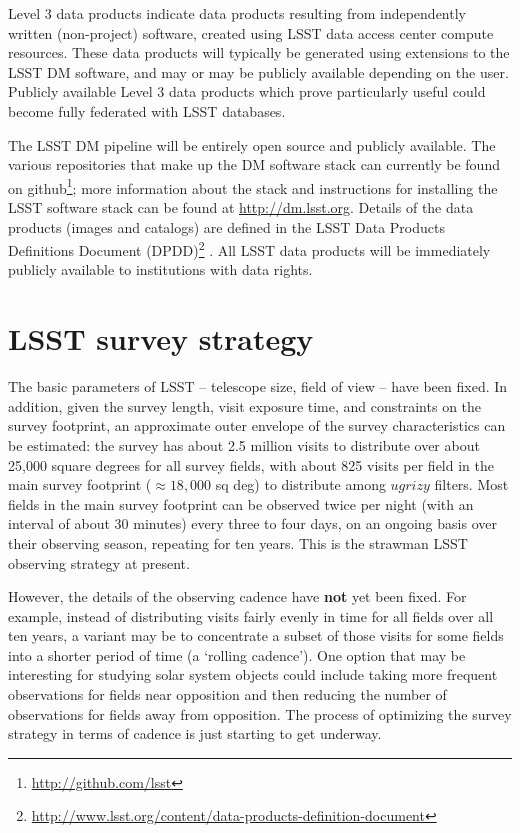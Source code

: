 \documentclass{iau}
\begin{document}
Level 3 data products indicate data products resulting from
independently written (non-project) software, created using LSST data
access center compute resources. These data products will typically be
generated using extensions to the LSST DM software, and may or may be
publicly available depending on the user. Publicly available Level 3
data products which prove particularly useful could become fully
federated with LSST databases.

The LSST DM pipeline will be entirely open source and publicly
available. The various repositories that make up the DM software stack
can currently be found on github\footnote{
\url{http://github.com/lsst}}; more information about the stack and
instructions for installing the LSST software stack can be found at
\url{http://dm.lsst.org}. Details of the data products (images and
catalogs) are defined in the LSST Data Products Definitions Document
(DPDD)\footnote{
\url{http://www.lsst.org/content/data-products-definition-document}}
. All LSST data products will be immediately publicly available to
institutions with data rights.

\section{LSST survey strategy}
\label{surveystrategy}

The basic parameters of LSST -- telescope
size, field of view -- have been fixed. In
addition, given the survey length, visit exposure time, and constraints on the survey
footprint, an approximate outer envelope of the survey characteristics can be
estimated: the survey has about 2.5 million visits to
distribute over about 25,000 square degrees for all survey fields,
with about 825 visits per field in the main survey footprint
($\approx18,000$ sq deg) to distribute among $ugrizy$ filters. Most
fields in the main survey footprint can be observed twice per night
(with an interval of about 30 minutes) every three to four days, on an
ongoing basis over their observing season, repeating for ten
years. This is the strawman LSST observing strategy at present.

However, the details of the observing cadence have {\bf not} yet been
fixed. For example, instead of distributing visits fairly evenly in time for all
fields over all ten years, a variant may be to
concentrate a subset of those visits for some fields into a shorter
period of time (a `rolling cadence'). One option that may be interesting for
studying solar system objects could include taking more frequent
observations for fields near opposition and then reducing the number
of observations for fields away from opposition. The process of
optimizing the survey strategy in terms of cadence is just starting to
get underway.
\end{document}
